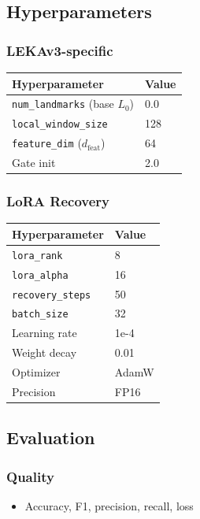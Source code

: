\subsection{Hyperparameters}

\subsubsection{LEKAv3-specific}

\begin{table}[H]
\centering
\small
\begin{tabular}{ll}
\toprule
\textbf{Hyperparameter} & \textbf{Value} \\
\midrule
\texttt{num\_landmarks} (base $L_0$) & 0.0 \\
\texttt{local\_window\_size} & 128 \\
\texttt{feature\_dim} ($d_\text{feat}$) & 64 \\
Gate init & 2.0 \\
\bottomrule
\end{tabular}
\end{table}

\subsubsection{LoRA Recovery}

\begin{table}[H]
\centering
\small
\begin{tabular}{ll}
\toprule
\textbf{Hyperparameter} & \textbf{Value} \\
\midrule
\texttt{lora\_rank} & 8 \\
\texttt{lora\_alpha} & 16 \\
\texttt{recovery\_steps} & 50 \\
\texttt{batch\_size} & 32 \\
Learning rate & 1e-4 \\
Weight decay & 0.01 \\
Optimizer & AdamW \\
Precision & FP16 \\
\bottomrule
\end{tabular}
\end{table}

\subsection{Evaluation}

\subsubsection{Quality}
\begin{itemize}
\item Accuracy, F1, precision, recall, loss

\end{itemize}
